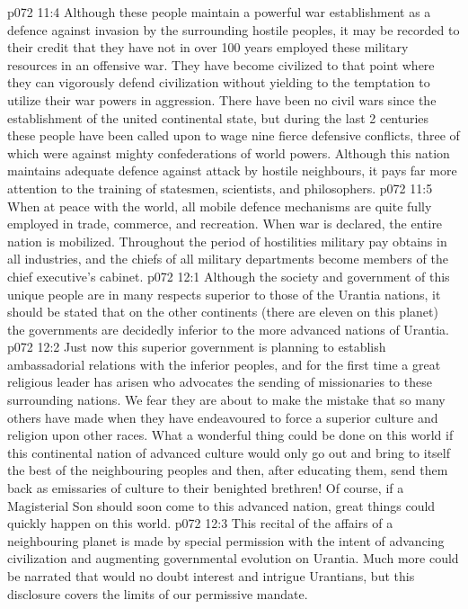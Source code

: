 \vs p072 11:4 \pc Although these people maintain a powerful war establishment as a defence against invasion by the surrounding hostile peoples, it may be recorded to their credit that they have not in over 100 years employed these military resources in an offensive war. They have become civilized to that point where they can vigorously defend civilization without yielding to the temptation to utilize their war powers in aggression. There have been no civil wars since the establishment of the united continental state, but during the last 2 centuries these people have been called upon to wage nine fierce defensive conflicts, three of which were against mighty confederations of world powers. Although this nation maintains adequate defence against attack by hostile neighbours, it pays far more attention to the training of statesmen, scientists, and philosophers.
\vs p072 11:5 When at peace with the world, all mobile defence mechanisms are quite fully employed in trade, commerce, and recreation. When war is declared, the entire nation is mobilized. Throughout the period of hostilities military pay obtains in all industries, and the chiefs of all military departments become members of the chief executive’s cabinet.
\vs p072 12:1 Although the society and government of this unique people are in many respects superior to those of the Urantia nations, it should be stated that on the other continents (there are eleven on this planet) the governments are decidedly inferior to the more advanced nations of Urantia.
\vs p072 12:2 Just now this superior government is planning to establish ambassadorial relations with the inferior peoples, and for the first time a great religious leader has arisen who advocates the sending of missionaries to these surrounding nations. We fear they are about to make the mistake that so many others have made when they have endeavoured to force a superior culture and religion upon other races. What a wonderful thing could be done on this world if this continental nation of advanced culture would only go out and bring to itself the best of the neighbouring peoples and then, after educating them, send them back as emissaries of culture to their benighted brethren! Of course, if a Magisterial Son should soon come to this advanced nation, great things could quickly happen on this world.
\vs p072 12:3 \pc This recital of the affairs of a neighbouring planet is made by special permission with the intent of advancing civilization and augmenting governmental evolution on Urantia. Much more could be narrated that would no doubt interest and intrigue Urantians, but this disclosure covers the limits of our permissive mandate.
